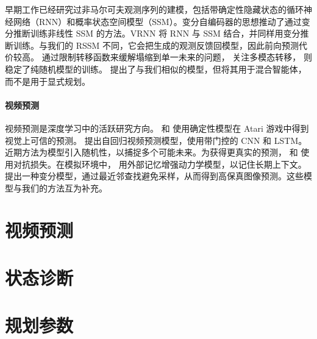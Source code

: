 早期工作已经研究过非马尔可夫观测序列的建模，包括带确定性隐藏状态的循环神经网络（RNN）和概率状态空间模型（SSM）。变分自编码器的思想\citep{kingma2013vae,rezende2014vae}推动了通过变分推断训练非线性 SSM 的方法\citep{krishnan2015deepkalman}。VRNN \citep{chung2015vrnn} 将 RNN 与 SSM 结合，并同样用变分推断训练。与我们的 RSSM 不同，它会把生成的观测反馈回模型，因此前向预测代价较高。\citet{karl2016dvbf} 通过限制转移函数来缓解塌缩到单一未来的问题，\citet{moerland2017learning} 关注多模态转移，\citet{doerr2018prssm} 则稳定了纯随机模型的训练。\citet{buesing2018dssm} 提出了与我们相似的模型，但将其用于混合智能体，而不是用于显式规划。

\paragraph{视频预测}

视频预测是深度学习中的活跃研究方向。\citet{oh2015atari} 和 \citet{chiappa2017recurrent} 使用确定性模型在 Atari 游戏中得到视觉上可信的预测。\citet{kalchbrenner2016vpn} 提出自回归视频预测模型，使用带门控的 CNN 和 LSTM。近期方法为模型引入随机性，以捕捉多个可能未来\citep{babaeizadeh2017sv2p,denton2018stochastic}。为获得更真实的预测，\citet{mathieu2015deep} 和 \citet{vondrick2016generating} 使用对抗损失。在模拟环境中，\citet{gemici2017temporalmemory} 用外部记忆增强动力学模型，以记住长期上下文。\citet{van2017vq} 提出一种变分模型，通过最近邻查找避免采样，从而得到高保真图像预测。这些模型与我们的方法互为补充。

\clearpage
\section{视频预测}
\label{sec:prediction}


\clearpage
\section{状态诊断}



\clearpage
\section{规划参数}


